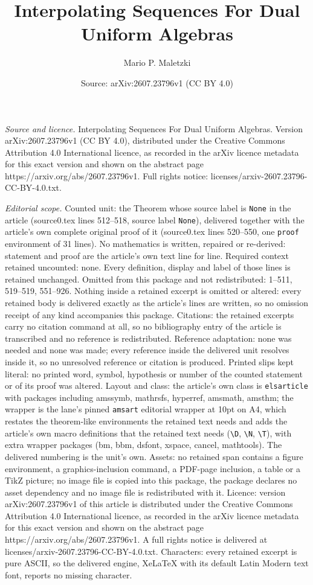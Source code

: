 \documentclass[10pt,a4paper]{amsart}
\title[Interpolating Sequences For Dual Uniform Algebras]{Interpolating Sequences For Dual Uniform Algebras}
\author{Mario P. Maletzki}
\date{Source: arXiv:2607.23796v1 (CC BY 4.0)}
\begin{document}
\maketitle

\noindent\emph{Source and licence.} Interpolating Sequences For Dual Uniform Algebras. Version arXiv:2607.23796v1 (CC BY 4.0), distributed under the Creative Commons Attribution 4.0 International licence, as recorded in the arXiv licence metadata for this exact version and shown on the abstract page https://arxiv.org/abs/2607.23796v1. Full rights notice: licenses/arxiv-2607.23796-CC-BY-4.0.txt.\par\smallskip

\noindent\textit{Editorial scope.} Counted unit: the Theorem whose source label is \texttt{None} in the article (source0.tex lines 512--518, source label \texttt{None}), delivered together with the article's own complete original proof of it (source0.tex lines 520--550, one \texttt{proof} environment of 31 lines). No mathematics is written, repaired or re-derived: statement and proof are the article's own text line for line. Required context retained uncounted: none. Every definition, display and label of those lines is retained unchanged. Omitted from this package and not redistributed: 1--511, 519--519, 551--926. Nothing inside a retained excerpt is omitted or altered: every retained body is delivered exactly as the article's lines are written, so no omission receipt of any kind accompanies this package. Citations: the retained excerpts carry no citation command at all, so no bibliography entry of the article is transcribed and no reference is redistributed. Reference adaptation: none was needed and none was made; every reference inside the delivered unit resolves inside it, so no unresolved reference or citation is produced. Printed slips kept literal: no printed word, symbol, hypothesis or number of the counted statement or of its proof was altered. Layout and class: the article's own class is \texttt{elsarticle} with packages including amssymb, mathrsfs, hyperref, amsmath, amsthm; the wrapper is the lane's pinned \texttt{amsart} editorial wrapper at 10pt on A4, which restates the theorem-like environments the retained text needs and adds the article's own macro definitions that the retained text needs (\texttt{\textbackslash D}, \texttt{\textbackslash N}, \texttt{\textbackslash T}), with extra wrapper packages (bm, bbm, dsfont, xspace, cancel, mathtools). The delivered numbering is the unit's own. Assets: no retained span contains a figure environment, a graphics-inclusion command, a PDF-page inclusion, a table or a TikZ picture; no image file is copied into this package, the package declares no asset dependency and no image file is redistributed with it. Licence: version arXiv:2607.23796v1 of this article is distributed under the Creative Commons Attribution 4.0 International licence, as recorded in the arXiv licence metadata for this exact version and shown on the abstract page https://arxiv.org/abs/2607.23796v1. A full rights notice is delivered at licenses/arxiv-2607.23796-CC-BY-4.0.txt. Characters: every retained excerpt is pure ASCII, so the delivered engine, XeLaTeX with its default Latin Modern text font, reports no missing character.
\end{document}
